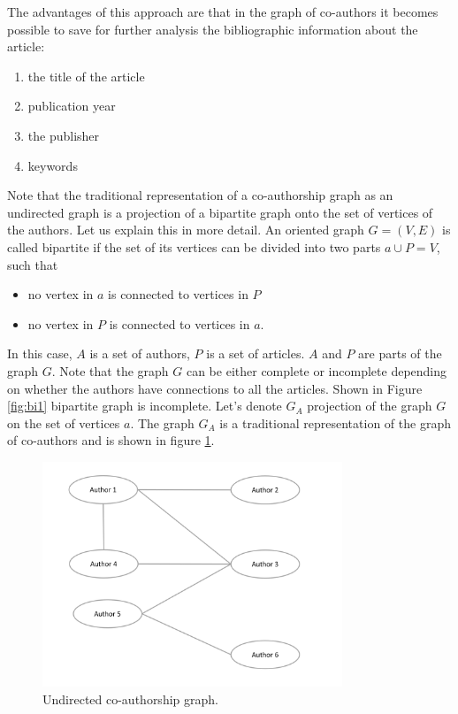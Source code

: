 \documentclass[12pt]{report}
\theoremstyle{definition}
\providecommand{\tightlist}{%
	\setlength{\itemsep}{0pt}\setlength{\parskip}{0pt}}
\begin{document}
The advantages of this approach are that in the graph of co-authors it becomes possible to save for further analysis the bibliographic information about the article: 

\begin{enumerate}
	\tightlist
	\item the title of the article 
	\item publication year 
	\item the publisher 
	\item keywords 
\end{enumerate}

Note that the traditional representation of a co-authorship graph as an undirected graph is a projection of a bipartite graph onto the set of vertices of the authors. 
Let us explain this in more detail. 
An oriented graph $G = (V,E)$ is called bipartite if the set of its vertices can be divided into two parts $ a \cup P = V$, such that 
\begin{itemize}
	\item no vertex in $a$ is connected to vertices in $P$
	\item no vertex in $P$ is connected to vertices in $a$.     
\end{itemize}

In this case, $A$ is a set of authors, $P$ is a set of articles. $A$ and $P$ are parts of the graph $G$.
Note that the graph $G$ can be either complete or incomplete depending on whether the authors have connections to all the articles. 
Shown in Figure \ref{fig:bi1} bipartite graph is incomplete. 
Let's denote $G_A$ projection of the graph $G$ on the set of vertices $a$.
The graph $G_A$ is a traditional representation of the graph of co-authors and is shown in figure \ref{fig:bi2}.

\begin{figure}[ht]
	\centering
	\includegraphics[width=0.8\textwidth]{bi2eng}
	\caption{Undirected co-authorship graph.}
	\label{fig:bi2}
\end{figure}  
\end{document}
